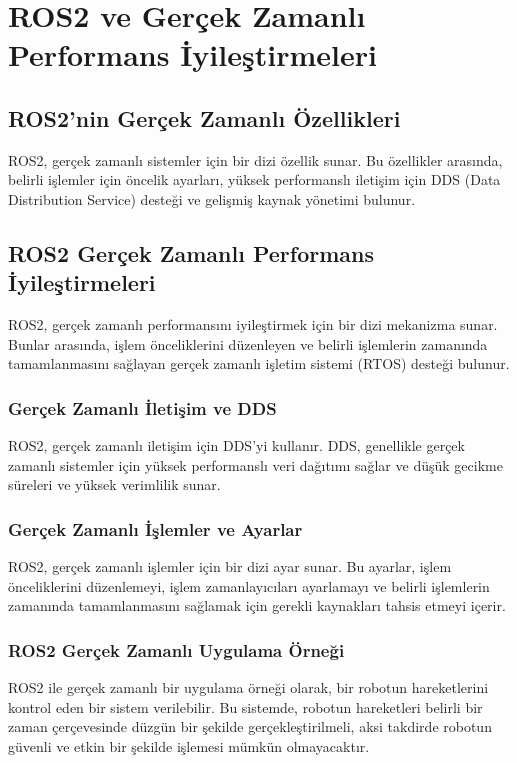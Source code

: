 \section{ROS2 ve Gerçek Zamanlı Performans İyileştirmeleri}
\subsection{ROS2'nin Gerçek Zamanlı Özellikleri}
ROS2, gerçek zamanlı sistemler için bir dizi özellik sunar. Bu özellikler arasında, belirli işlemler için öncelik ayarları, yüksek performanslı iletişim için DDS (Data Distribution Service) desteği ve gelişmiş kaynak yönetimi bulunur.

\subsection{ROS2 Gerçek Zamanlı Performans İyileştirmeleri}
ROS2, gerçek zamanlı performansını iyileştirmek için bir dizi mekanizma sunar. Bunlar arasında, işlem önceliklerini düzenleyen ve belirli işlemlerin zamanında tamamlanmasını sağlayan gerçek zamanlı işletim sistemi (RTOS) desteği bulunur.

\subsubsection{Gerçek Zamanlı İletişim ve DDS}
ROS2, gerçek zamanlı iletişim için DDS'yi kullanır. DDS, genellikle gerçek zamanlı sistemler için yüksek performanslı veri dağıtımı sağlar ve düşük gecikme süreleri ve yüksek verimlilik sunar.

\subsubsection{Gerçek Zamanlı İşlemler ve Ayarlar}
ROS2, gerçek zamanlı işlemler için bir dizi ayar sunar. Bu ayarlar, işlem önceliklerini düzenlemeyi, işlem zamanlayıcıları ayarlamayı ve belirli işlemlerin zamanında tamamlanmasını sağlamak için gerekli kaynakları tahsis etmeyi içerir.

\subsubsection{ROS2 Gerçek Zamanlı Uygulama Örneği}
ROS2 ile gerçek zamanlı bir uygulama örneği olarak, bir robotun hareketlerini kontrol eden bir sistem verilebilir. Bu sistemde, robotun hareketleri belirli bir zaman çerçevesinde düzgün bir şekilde gerçekleştirilmeli, aksi takdirde robotun güvenli ve etkin bir şekilde işlemesi mümkün olmayacaktır.